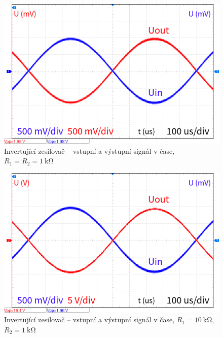 \documentclass{protokol}
\begin{document}
\begin{figure}[h!]
	\centering
	\includegraphics[width=\textwidth]{oscilo/output11.png}
	\centering
	\caption{Invertující zesilovač -- vstupní a	výstupní signál v čase, $R_1=R_2=\SI{1}{\kilo\ohm}$}
	\label{fig:i-l-prenos-1k}
\end{figure}

\begin{figure}[h!]
	\centering
	\includegraphics[width=\textwidth]{oscilo/output12.png}
	\centering
	\caption{Invertující zesilovač -- vstupní a	výstupní signál v čase, $R_1=\SI{10}{\kilo\ohm}$, $R_2=\SI{1}{\kilo\ohm}$}
	\label{fig:i-l-prenos-10k}
\end{figure}
\end{document}
